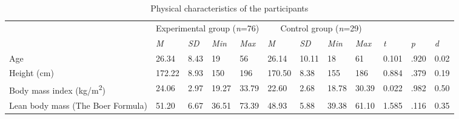 \documentclass[authordate, empirical,issue]{jote-new-article}
\begin{document}
\begin{table}
  \begin{fullwidth}
    \caption{Physical characteristics of the participants}
    \begin{tabularx}{\linewidth}{@{} >{\RaggedRight\arraybackslash}m{9em} X X X X X X X X | X X X@{}}
      \toprule                                           & \multicolumn{4}{c}{Experimental group (\emph{n}=76)} &
      \multicolumn{4}{c}{Control group (\emph{n}=29)}    &                                                      &            &                                                                            \\

                                                         & \emph{M}                                             & \emph{SD}  & \emph{Min} & \emph{Max} & \emph{M} & \emph{SD}
                                                         & \emph{Min}                                           & \emph{Max} & \emph{t}   & \emph{p}   & \emph{d}                                         \\

      \hline Age                                         & 26.34                                                & 8.43       & 19         & 56         & 26.14    & 10.11     & 18   & 61  & 0.101 & .920
                                                         & 0.02                                                                                                                                           \\

      Height (cm)                                        & 172.22                                               & 8.93       & 150        & 196        & 170.50   & 8.38      & 155  & 186 & 0.884
                                                         & .379                                                 & 0.19                                                                                    \\

      Body mass index \newline (kg/m\textsuperscript{2}) & 24.06                                                & 2.97       & 19.27      & 33.79
                                                         & 22.60                                                & 2.68       & 18.78      & 30.39      & 0.022    & .982      & 0.50                      \\

      Lean body mass \newline (The Boer Formula)         & 51.20                                                & 6.67       & 36.51      & 73.39      & 48.93
                                                         & 5.88                                                 & 39.38      & 61.10      & 1.585      & .116     & 0.35                                  \\
      \bottomrule
    \end{tabularx}
  \end{fullwidth}
\end{table}
\end{document}
